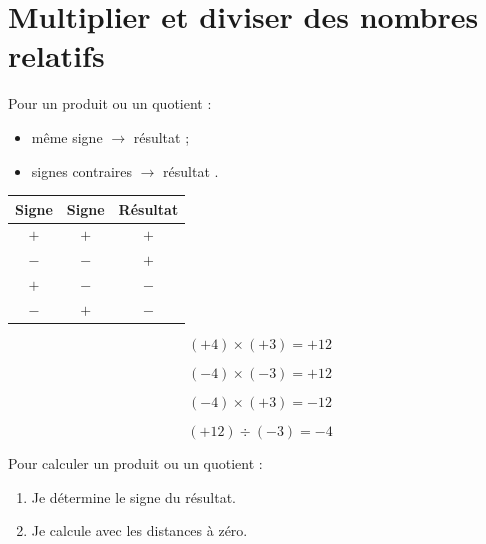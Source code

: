 \section{Multiplier et diviser des nombres relatifs}

\begin{propbox}

Pour un produit ou un quotient :

\begin{itemize}
    \item même signe $\rightarrow$ résultat  ;
    \item signes contraires $\rightarrow$ résultat .
\end{itemize}
\end{propbox}

\begin{center}
\begin{tabular}{c|c|c}
Signe & Signe & Résultat \\ \hline
$+$ & $+$ & $+$ \\
$-$ & $-$ & $+$ \\
$+$ & $-$ & $-$ \\
$-$ & $+$ & $-$
\end{tabular}
\end{center}

\begin{exemplebox}
\[
(+4)\times(+3)=+12
\]

\[
(-4)\times(-3)=+12
\]

\[
(-4)\times(+3)=-12
\]

\[
(+12)\div(-3)=-4
\]
\end{exemplebox}

\begin{methodebox}
Pour calculer un produit ou un quotient :

\begin{enumerate}
    \item Je détermine le signe du résultat.
    \item Je calcule avec les distances à zéro.
\end{enumerate}
\end{methodebox}

\begin{attentionbox}

\end{attentionbox}
